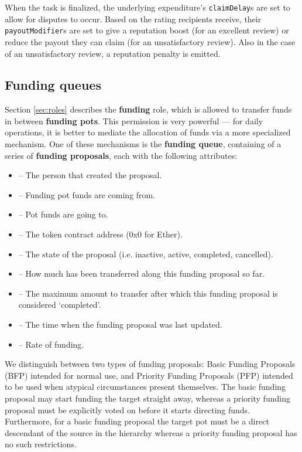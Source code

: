 When the task is finalized, the underlying expenditure's \texttt{claimDelay}s are set to allow for disputes to occur. Based on the rating recipients receive, their \texttt{payoutModifier}s are set to give a reputation boost (for an excellent review) or reduce the payout they can claim (for an unsatisfactory review). Also in the case of an unsatisfactory review, a reputation penalty is emitted.

\subsection{Funding queues}\label{sec:funding-queues}

Section \ref{sec:roles} describes the \textbf{funding} role, which is allowed to transfer funds in between \textbf{funding pots}. This permission is very powerful --- for daily operations, it is better to mediate the allocation of funds via a more specialized mechanism. One of these mechanisms is the \textbf{funding queue}, containing of a series of \textbf{funding proposals}, each with the following attributes:

 \begin{itemize}
  \item {} -- The person that created the proposal.
  \item {} -- Funding pot funds are coming from.
  \item {} -- Pot funds are going to.
  \item {} -- The token contract address (0x0 for Ether).
  \item {} -- The state of the proposal (i.e. inactive, active, completed, cancelled).
  \item {} -- How much has been transferred along this funding proposal so far.
  \item {} -- The maximum amount to transfer after which this funding proposal is considered `completed'.
  \item {} -- The time when the funding proposal was last updated.
  \item {} -- Rate of funding.
 \end{itemize}

We distinguish between two types of funding proposals: Basic Funding Proposals (BFP) intended for normal use, and Priority Funding Proposals (PFP) intended to be used when atypical circumstances present themselves. The basic funding proposal may start funding the target straight away, whereas a priority funding proposal must be explicitly voted on before it starts directing funds. Furthermore, for a basic funding proposal the target pot must be a direct descendant of the source in the hierarchy whereas a priority funding proposal has no such restrictions.

